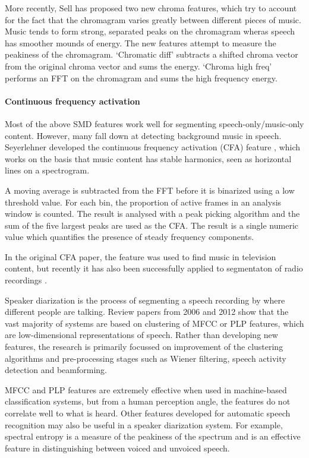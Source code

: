 More recently, Sell \citep{Sell2014} has proposed two new chroma features, which try to account for the fact that the
chromagram varies greatly between different pieces of music. Music tends to form strong, separated peaks on the
chromagram wheras speech has smoother mounds of energy. The new features attempt to measure the peakiness of the
chromagram. `Chromatic diff' subtracts a shifted chroma vector from the original chroma vector and sums the energy.
`Chroma high freq' performs an FFT on the chromagram and sums the high frequency energy.

\paragraph{Continuous frequency activation}
Most of the above SMD features work well for segmenting speech-only/music-only content. However, many fall down at
detecting background music in speech.  Seyerlehner developed the continuous frequency activation (CFA) feature
\citep{Seyerlehner2007}, which works on the basis that music content has stable harmonics, seen as horizontal lines on
a spectrogram.

A moving average is subtracted from the FFT before it is binarized using a low threshold value. For each bin, the
proportion of active frames in an analysis window is counted. The result is analysed with a peak picking algorithm and
the sum of the five largest peaks are used as the CFA. The result is a single numeric value which quantifies the
presence of steady frequency components.

In the original CFA paper, the feature was used to find music in television content, but recently it has also been
successfully applied to segmentaton of radio recordings \citep{Wieser2014}.

Speaker diarization is the process of segmenting a speech recording by where different people are talking. Review
papers from 2006 \citep{Tranter2006} and 2012 \citep{AngueraMiro2012} show that the vast majority of systems are based
on clustering of MFCC or PLP features, which are low-dimensional representations of speech. Rather than developing new
features, the research is primarily focussed on improvement of the clustering algorithms and pre-processing stages such
as Wiener filtering, speech activity detection and beamforming.

MFCC and PLP features are extremely effective when used in machine-based classification systems, but from a human
perception angle, the features do not correlate well to what is heard.  Other features developed for automatic speech
recognition may also be useful in a speaker diarization system. For example, spectral entropy \citep{Misra2004} is a
measure of the peakiness of the spectrum and is an effective feature in distinguishing between voiced and unvoiced
speech.

